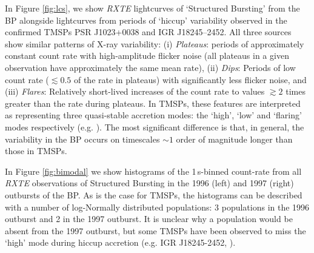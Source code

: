 \par In Figure \ref{fig:lcs}, we show \textit{RXTE} lightcurves of `Structured Bursting' from the BP alongside lightcurves from periods of `hiccup' variability observed in the confirmed TMSPs PSR J1023+0038 and IGR J18245--2452. All three sources show similar patterns of X-ray variability: 
%
(i) \textit{Plateaus}: periods of approximately constant count rate with high-amplitude flicker noise (all plateaus in a given observation have approximately the same mean rate),
%
(ii) \textit{Dips}: Periods of low count rate ($\lesssim0.5$ of the rate in plateaus) with significantly less flicker noise, and 
%
(iii) \textit{Flares}: Relatively short-lived increases of the count rate to values $\gtrsim2$ times greater than the rate during plateaus.
%
In TMSPs, these features are interpreted as representing three quasi-stable accretion modes: the `high', `low' and `flaring' modes respectively (e.g. \citealp{Bogdanov_TMSPVar}). The most significant difference is that, in general, the variability in the BP occurs on timescales $\sim1$ order of magnitude longer than those in TMSPs.

%
%
%

\par In Figure \ref{fig:bimodal} we show histograms of the 1\,s-binned count-rate from all \textit{RXTE} observations of Structured Bursting in the 1996 (left) and 1997 (right) outbursts of the BP. As is the case for TMSPs, the histograms can be described with a number of log-Normally distributed populations: 3 populations in the 1996 outburst and 2 in the 1997 outburst. It is unclear why a population would be absent from the 1997 outburst, but some TMSPs have been observed to miss the `high' mode during hiccup accretion (e.g. IGR J18245-2452, \citealp{Ferrigno_TMSPVar}).

